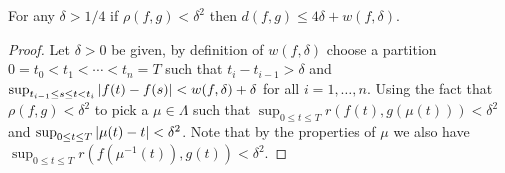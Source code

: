 \begin{lem}\label{SkorohodEquivalenceB}For any $\delta>1/4$ if $\rho(f,g) < \delta^2$ then $d(f,g) \leq 4\delta + w(f,\delta)$.
\end{lem}
\begin{proof}
Let $\delta > 0$ be given, by definition of $w(f,\delta)$ choose a partition $0=t_0 < t_1 < \dotsb < t_n=T$ such that 
$t_i - t_{i-1} > \delta$ and $\sup_{t_{i-1} \leq s \leq t < t_i} \left \vert f(t) - f(s) \right \vert < w(f,\delta) + \delta$ 
for all $i=1, \dotsc, n$.  Using the fact that $\rho(f,g) < \delta^2$ to pick a $\mu \in \Lambda$ such that 
$\sup_{0 \leq t \leq T} r(f(t),g(\mu(t))) < \delta^2$  and $\sup_{0 \leq t \leq T} \left \vert \mu(t) - t \right \vert < \delta^2$.  Note that 
by the properties of $\mu$ we also have $\sup_{0 \leq t \leq T} r(f(\mu^{-1}(t)), g(t)) < \delta^2$.


\end{proof}
